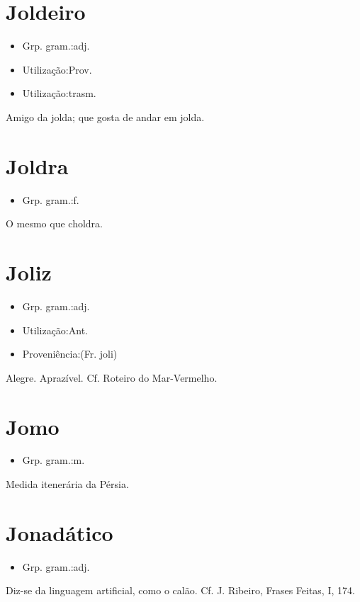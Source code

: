 \documentclass{article}
\begin{document}
\section{Joldeiro}
\begin{itemize}
\item {Grp. gram.:adj.}
\end{itemize}
\begin{itemize}
\item {Utilização:Prov.}
\end{itemize}
\begin{itemize}
\item {Utilização:trasm.}
\end{itemize}
Amigo da jolda; que gosta de andar em jolda.
\section{Joldra}
\begin{itemize}
\item {Grp. gram.:f.}
\end{itemize}
O mesmo que \textunderscore choldra\textunderscore .
\section{Joliz}
\begin{itemize}
\item {Grp. gram.:adj.}
\end{itemize}
\begin{itemize}
\item {Utilização:Ant.}
\end{itemize}
\begin{itemize}
\item {Proveniência:(Fr. \textunderscore joli\textunderscore )}
\end{itemize}
Alegre.
Aprazível. Cf. \textunderscore Roteiro do Mar-Vermelho\textunderscore .
\section{Jomo}
\begin{itemize}
\item {Grp. gram.:m.}
\end{itemize}
Medida itenerária da Pérsia.
\section{Jonadático}
\begin{itemize}
\item {Grp. gram.:adj.}
\end{itemize}
Diz-se da linguagem artificial, como o calão. Cf. J. Ribeiro, \textunderscore Frases Feitas\textunderscore , I, 174.
\end{document}
